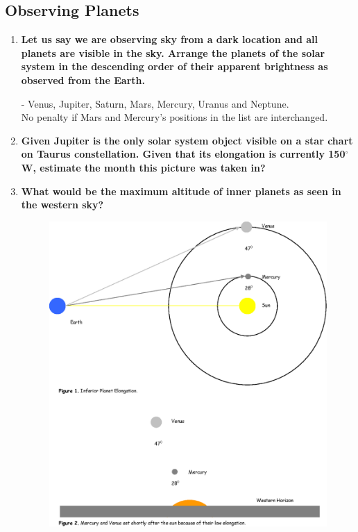 \documentclass[a4paper,12pt]{extarticle}
\begin{document}
\clearpage
\subsection{Observing Planets}

\begin{enumerate}
	\item \textbf{Let us say we are observing sky from a dark location and all planets are visible in the sky. Arrange the planets of the solar system in the descending order of their apparent brightness as observed from the Earth.}
\begin{sol}
	- Venus, Jupiter, Saturn, Mars, Mercury, Uranus and Neptune.\\
No penalty if Mars and Mercury’s positions in the list are interchanged.	
\end{sol}
	\item \textbf{Given Jupiter is the only solar system object visible on a star chart on Taurus constellation. Given that its elongation is currently 150$^\circ$W, estimate the month this picture was taken in?}
	\item \textbf{What would be the maximum altitude of inner planets as seen in the western sky?}
	\begin{figure}[H]
		\centering
		\includegraphics[width=0.6\linewidth]{elong_planets.eps}
	\end{figure}


\end{enumerate}
\end{document}

